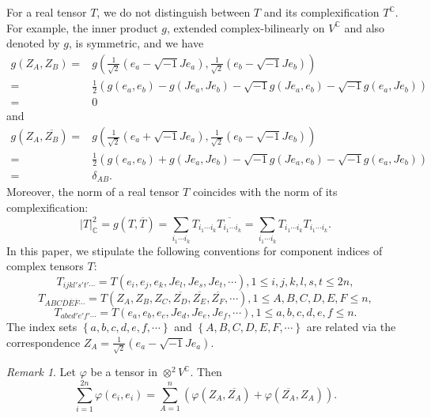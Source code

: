 \documentclass{amsart}
\theoremstyle{definition}
\theoremstyle{remark}
\newtheorem{remark}[theorem]{Remark}
\numberwithin{equation}{section}
\begin{document}
For a real tensor $T$, we do not distinguish between $T$ and its complexification $T^{\mathbb{C}}$. For example, the inner product $g$, extended complex-bilinearly on ${V^{\mathbb{C}}}$ and also denoted by $g$,  is symmetric, and we have
\begin{align*}
{g}\left( {{Z_A},{Z_B}} \right) =& {g}\left( {\frac{1}{{\sqrt 2 }}\left( {{e_a} - \sqrt { - 1} J{e_a}} \right),\frac{1}{{\sqrt 2 }}\left( {{e_b} - \sqrt { - 1} J{e_b}} \right)} \right)\\
 =& \frac{1}{2}\left( {g\left( {{e_a},{e_b}} \right) - g\left( {J{e_a},J{e_b}} \right) - \sqrt { - 1} g\left( {J{e_a},{e_b}} \right) - \sqrt { - 1} g\left( {{e_a},J{e_b}} \right)} \right)\\
 =& 0
 \end{align*}
and
\begin{align*}
{g}\left( {{Z_A},\overline {{Z_B}} } \right) =& {g}\left( {\frac{1}{{\sqrt 2 }}\left( {{e_a} + \sqrt { - 1} J{e_a}} \right),\frac{1}{{\sqrt 2 }}\left( {{e_b} - \sqrt { - 1} J{e_b}} \right)} \right)\\
 =& \frac{1}{2}\left( {g\left( {{e_a},{e_b}} \right) + g\left( {J{e_a},J{e_b}} \right) - \sqrt { - 1} g\left( {J{e_a},{e_b}} \right) - \sqrt { - 1} g\left( {{e_a},J{e_b}} \right)} \right)\\
 =& {\delta _{AB}}.
\end{align*}
Moreover, the norm of a real tensor $T$ coincides with the norm of its complexification:
$$\left| T \right|_\mathbb{C}^2 = g\left( {T,\overline T } \right) = \sum\limits_{{i_1} \cdots {i_k}}^{} {{T_{{i_1} \cdots {i_k}}}\overline {{T_{{i_1} \cdots {i_k}}}} }  = \sum\limits_{{i_1} \cdots {i_k}}^{} {{T_{{i_1} \cdots {i_k}}}{T_{{i_1} \cdots {i_k}}}}.$$
In this paper, we stipulate the following conventions for component indices of complex tensors  $T$:
$${T_{ijkl's't' \cdots }} = T\left( {{e_i},{e_j},{e_k},J{e_l},J{e_s},J{e_t}, \cdots } \right),1 \le i,j,k,l,s,t \le 2n, $$
$${T_{ABC\overline D \overline E \overline F  \cdots }} = T\left( {{Z_A},{Z_B},{Z_C},\overline {{Z_D}} ,\overline {{Z_E}} ,\overline {{Z_F}} , \cdots } \right),1 \le A,B,C,D,E,F \le n, $$
$${T_{abcd'e'f' \cdots }} = T\left( {{e_a},{e_b},{e_c},J{e_d},J{e_e},J{e_f}, \cdots } \right),1 \le a,b,c,d,e,f \le n. $$
The index sets  $\left\{ a,b,c,d,e,f,\cdots \right\}$ and $\left\{ A,B,C,D,E,F,\cdots\right\}$ are related via the correspondence ${Z_A} = \frac{1}{{\sqrt 2 }}\left( {{e_a} - \sqrt { - 1} J{e_a}} \right)$.

\begin{remark}
\label{remark2.1}
Let $\varphi$ be a tensor in $\otimes^2 {V^ {\mathbb{C}}}$. Then
$$\sum\limits_{i = 1}^{2n} {\varphi \left( {{e_i},{e_i}} \right) = \sum\limits_{A = 1}^n {\left( {\varphi \left( {{Z_A},\overline {{Z_A}} } \right) + \varphi \left( {\overline {{Z_A}} ,{Z_A}} \right)} \right)} }. $$
\end{remark}
\end{document}
